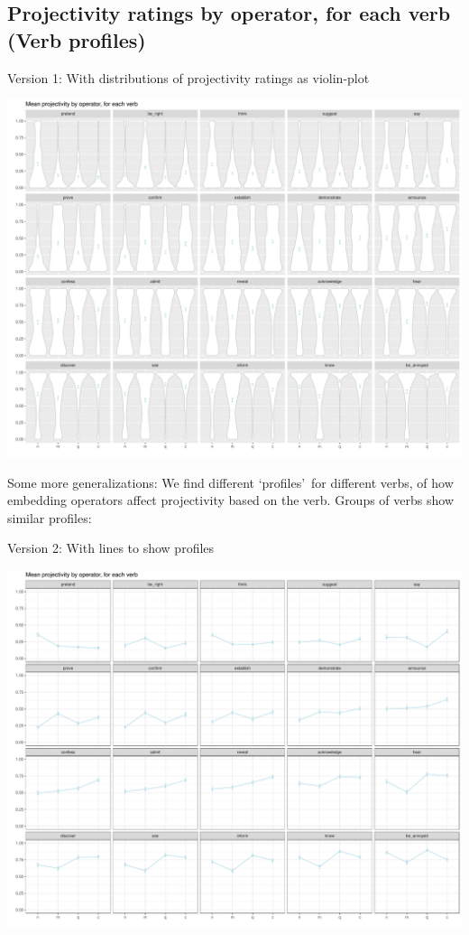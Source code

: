 \documentclass[10pt]{article}\usepackage[]{graphicx}\usepackage[dvipsnames]{xcolor}
\newenvironment{knitrout}{}{} %
\begin{document}
\newpage
\subsection{Projectivity ratings by operator, for each verb (Verb profiles)}
Version 1: With distributions of projectivity ratings as violin-plot
\begin{knitrout}
\color{fgcolor}

{\centering \includegraphics[width=\linewidth]{figures/verb-profiles-1-1} 

}


\end{knitrout}
Some more generalizations: We find different \lq profiles\rq\ for different verbs, of how embedding operators affect projectivity based on the verb. Groups of verbs show similar profiles:

\newpage
\noindent Version 2: With lines to show profiles
\begin{knitrout}
\color{fgcolor}

{\centering \includegraphics[width=\linewidth]{figures/verb-profiles-2-1} 

}


\end{knitrout}
\end{document}

